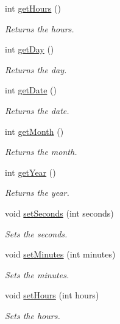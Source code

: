 \begin{DoxyCompactItemize}
int \hyperlink{classds3231_a711ac9181f3012073fdc82a57493340b}{get\+Hours} ()
\begin{DoxyCompactList}\small\item\em Returns the hours. \end{DoxyCompactList}\item 
int \hyperlink{classds3231_a8a2bdd6773998e3dc0799f6389ab11ef}{get\+Day} ()
\begin{DoxyCompactList}\small\item\em Returns the day. \end{DoxyCompactList}\item 
int \hyperlink{classds3231_a37b8905a4661c6961b006b339e22ac4a}{get\+Date} ()
\begin{DoxyCompactList}\small\item\em Returns the date. \end{DoxyCompactList}\item 
int \hyperlink{classds3231_a7e1af01368e452db3fb31a091ed06321}{get\+Month} ()
\begin{DoxyCompactList}\small\item\em Returns the month. \end{DoxyCompactList}\item 
int \hyperlink{classds3231_a32991ca3c1e1242a8316cd08df22b63d}{get\+Year} ()
\begin{DoxyCompactList}\small\item\em Returns the year. \end{DoxyCompactList}\item 
void \hyperlink{classds3231_ae78fad4364f782cc01a23670ffa3a1a4}{set\+Seconds} (int seconds)
\begin{DoxyCompactList}\small\item\em Sets the seconds. \end{DoxyCompactList}\item 
void \hyperlink{classds3231_a2fa4365f601b3048b28f51785aa0941e}{set\+Minutes} (int minutes)
\begin{DoxyCompactList}\small\item\em Sets the minutes. \end{DoxyCompactList}\item 
void \hyperlink{classds3231_a94cb9847db3e8f0072e6aad1df481164}{set\+Hours} (int hours)
\begin{DoxyCompactList}\small\item\em Sets the hours. \end{DoxyCompactList}\item 

\end{DoxyCompactItemize}
